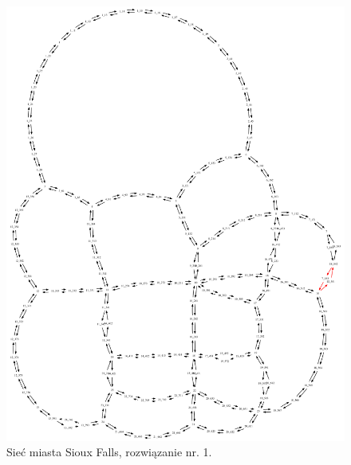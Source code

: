 \documentclass[twoside,12pt]{report}
\begin{document}
\begin{figure}[ht]
\centering
\includegraphics[totalheight=0.580\textheight, angle=90]{img/sioux-out/1/network2}
\caption{Sieć miasta Sioux Falls, rozwiązanie nr. 1.}
\label{sioux1}
\end{figure}
\end{document}

